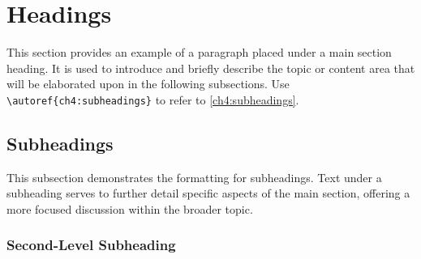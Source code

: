 


\section{Headings}
\label{ch4:headings}

\begin{paragraph}
This section provides an example of a paragraph placed under a main section heading. It is used to introduce and briefly describe the topic 
or content area that will be elaborated upon in the following subsections. Use \verb|\autoref{ch4:subheadings}| to refer to \autoref{ch4:subheadings}.
\end{paragraph}

\subsection{Subheadings}
\label{ch4:subheadings}

\begin{subparagraph}
This subsection demonstrates the formatting for subheadings. Text under a subheading serves to further detail specific aspects of the main section, offering a more focused discussion within the broader topic.
\end{subparagraph}

\subsubsection{Second-Level Subheading}
\label{ch4:subsub:example}

